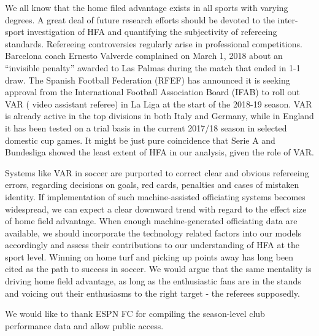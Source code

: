 \documentclass[USenglish]{article}
\begin{document}
We all know that the home filed advantage exists in all sports with varying degrees. A great deal of future research efforts should be devoted to the inter-sport investigation of HFA and quantifying the subjectivity of refereeing standards. 
Refereeing controversies regularly arise in professional competitions. Barcelona coach Ernesto Valverde complained on March 1, 2018 about an “invisible penalty” awarded to Las Palmas during the match that ended  in 1-1 draw.
The Spanish Football Federation (RFEF) has announced it is seeking approval from the International Football Association Board (IFAB) to roll out VAR ( video assistant referee)  in La Liga at the start of the 2018-19 season. VAR is already active in the top divisions in both Italy and Germany, while in England it has been tested on a trial basis in the current 2017/18 season in selected domestic cup games. It might be just pure coincidence that Serie A and Bundesliga showed the least extent of HFA in our analysis, given the role of VAR. 

Systems like VAR in soccer are purported to correct clear and obvious refereeing errors, regarding decisions on goals, red cards, penalties and cases of mistaken identity. If implementation of such machine-assisted officiating  systems becomes widespread, we can expect a clear downward trend with regard to the effect size of home field advantage. When enough machine-generated officiating data are available, we should incorporate the technology related factors into our models accordingly and assess their contributions to our understanding of HFA at the sport level. Winning on home turf and picking up points away has long been cited as the path to success in soccer. We would argue that the same mentality is driving home field advantage, as long as the enthusiastic fans are in the stands and voicing out their enthusiasms to the right target - the referees supposedly.   
 

\newpage
\begin{acknowledgement}

We would like to thank ESPN FC for compiling the season-level club performance data and allow public access.

\end{acknowledgement}

\newpage

%

\end{document}
